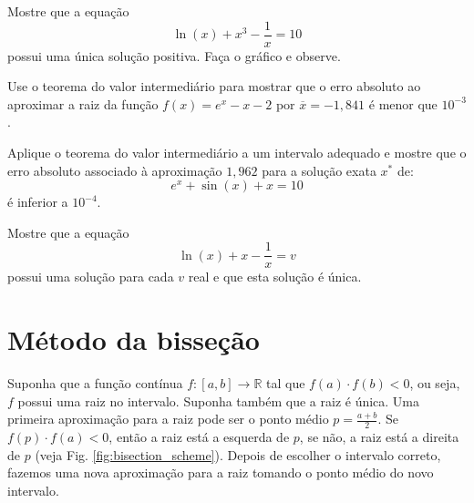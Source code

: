 \begin{Exercise}Mostre que a equação
  \begin{equation*}
    \ln(x)+x^3-\frac{1}{x}=10  
  \end{equation*}
possui uma única solução positiva. Faça o gráfico e observe.
\end{Exercise}

\begin{Exercise} Use o teorema do valor intermediário para mostrar que o erro absoluto ao aproximar a raiz da função $f(x)=e^x-x-2$ por $\overline{x}=-1,841$ é menor que $10^{-3}$.
\end{Exercise}

\begin{Exercise} Aplique o teorema do valor intermediário a um intervalo adequado e mostre que o erro absoluto associado à aproximação $1,962$ para a solução  exata $x^*$ de:
  \begin{equation*}
    e^x+\sin (x) +x = 10  
  \end{equation*}
é inferior a $10^{-4}$.
\end{Exercise}

\begin{Exercise}\label{existe_unica} Mostre que a equação
  \begin{equation*}
    \ln(x)+x-\frac{1}{x}=v
  \end{equation*}
possui uma solução para cada $v$ real e que esta solução é única.
\end{Exercise}


\section{Método da bisseção}

Suponha que a função contínua $f:[a,b]\to\mathbb{R}$ tal que $f(a)\cdot f(b)<0$, ou seja, $f$ possui uma raiz no intervalo. Suponha também que a raiz é única. Uma primeira aproximação para a raiz pode ser o ponto médio $p=\frac{a+b}{2}$. Se $f(p)\cdot f(a)<0$, então a raiz está a esquerda de $p$, se não, a raiz está a direita de $p$ (veja Fig. \ref{fig:bisection_scheme}). Depois de escolher o intervalo correto, fazemos uma nova aproximação para a raiz tomando o ponto médio do novo intervalo.

